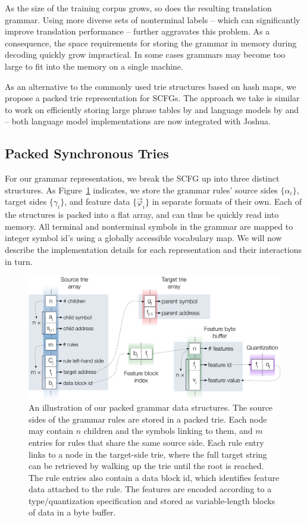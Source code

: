 \documentclass[11pt]{article}
\begin{document}
As the size of the training corpus grows, so does the resulting
translation grammar. Using more diverse sets of nonterminal labels --
which can significantly improve translation performance -- further
aggravates this problem. As a consequence, the space requirements for
storing the grammar in memory during decoding quickly grow
impractical. In some cases grammars may become too large to fit into
the memory on a single machine.

As an alternative to the commonly used trie structures based on hash
maps, we propose a packed trie representation for SCFGs. The approach
we take is similar to work on efficiently storing large phrase tables
by  and language models by  and
 -- both language model implementations are now
integrated with Joshua.

\subsection{Packed Synchronous Tries}

For our grammar representation, we break the SCFG up into three
distinct structures. As Figure~\ref{fig-packed-structure} indicates,
we store the grammar rules' source sides $\{\alpha_i\}$, target sides
$\{\gamma_i\}$, and feature data $\{\vec{\varphi}_i\}$ in separate
formats of their own. Each of the structures is packed into a flat
array, and can thus be quickly read into memory. All terminal and
nonterminal symbols in the grammar are mapped to integer symbol id's
using a globally accessible vocabulary map. We will now describe the
implementation details for each representation and their interactions
in turn.

\begin{figure}[!th]
\begin{center}
\includegraphics[width=0.9\linewidth]{figures/packed_structure.pdf}
\end{center}
\caption{An illustration of our packed grammar data structures. The
  source sides of the grammar rules are stored in a packed trie. Each
  node may contain $n$ children and the symbols linking to them, and
  $m$ entries for rules that share the same source side. Each rule
  entry links to a node in the target-side trie, where the full target
  string can be retrieved by walking up the trie until the root is
  reached. The rule entries also contain a data block id, which
  identifies feature data attached to the rule. The features are
  encoded according to a type/quantization specification and stored as
  variable-length blocks of data in a byte buffer.}
\label{fig-packed-structure}
\end{figure}
\end{document}
